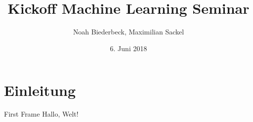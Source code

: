 \documentclass{beamer}
\title{Kickoff Machine Learning Seminar}
\date{6. Juni 2018}
\author{Noah Biederbeck, Maximilian Sackel}
\begin{document}
  \maketitle
  \section{Einleitung}
  \begin{frame}{First Frame}
    Hallo, Welt!
  \end{frame}
\end{document}
